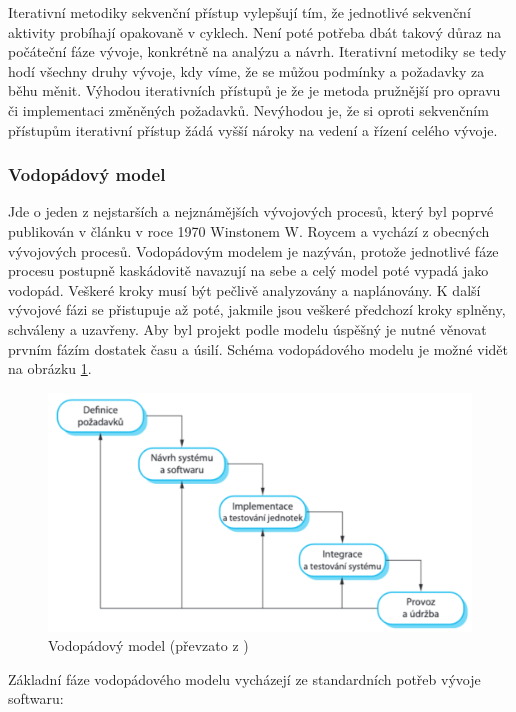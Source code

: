 \documentclass[czech,master,public,dept460,male,cpdeclaration,oneside]{diploma}
\begin{document}
Iterativní metodiky sekvenční přístup vylepšují tím, že jednotlivé sekvenční aktivity probíhají opakovaně v cyklech. Není poté potřeba dbát takový důraz na počáteční fáze vývoje, konkrétně na analýzu a návrh. Iterativní metodiky se tedy hodí všechny druhy vývoje, kdy víme, že se můžou podmínky a požadavky za běhu měnit. Výhodou iterativních přístupů je že je metoda pružnější pro opravu či implementaci změněných požadavků. Nevýhodou je, že si oproti sekvenčním přístupům iterativní přístup žádá vyšší nároky na vedení a řízení celého vývoje. 

\subsubsection{Vodopádový model}
Jde o jeden z nejstarších a nejznámějších vývojových procesů, který byl poprvé publikován v článku v roce 1970 Winstonem W. Roycem a vychází z obecných vývojových procesů. Vodopádovým modelem je nazýván, protože jednotlivé fáze procesu postupně kaskádovitě navazují na sebe a celý model poté vypadá jako vodopád. Veškeré kroky musí být pečlivě analyzovány a naplánovány. K další vývojové fázi se přistupuje až poté, jakmile jsou veškeré předchozí kroky splněny, schváleny a uzavřeny. \cite{ref:sommerrville_waterfall} Aby byl projekt podle modelu úspěšný je nutné věnovat prvním fázím dostatek času a úsilí. Schéma vodopádového modelu je možné vidět na obrázku \ref{fig:waterfall}.

\begin{figure}[!ht]
    \centering
    \includegraphics[width=1\textwidth]{Diplomka/Figures/waterfall.png}
    \caption{Vodopádový model (převzato z \cite{ref:sommerrville_waterfall})}
    \label{fig:waterfall}
\end{figure}

Základní fáze vodopádového modelu vycházejí ze standardních potřeb vývoje softwaru:
\end{document}
